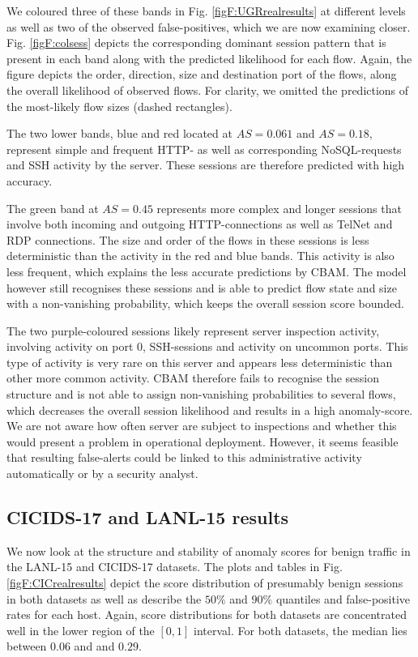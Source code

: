 We coloured three of these bands in Fig. \ref{figF:UGRrealresults} at different levels as well as two of the observed false-positives, which we are now examining closer. Fig. \ref{figF:colsess} depicts the corresponding dominant session pattern that is present in each band along with the predicted likelihood for each flow. Again, the figure depicts the order, direction, size and destination port of the flows, along the overall likelihood of observed flows. For clarity, we omitted the predictions of the most-likely flow sizes (dashed rectangles).

The two lower bands, blue and red located at $AS=0.061$ and $AS=0.18$, represent simple and frequent HTTP- as well as corresponding NoSQL-requests and SSH activity by the server. These sessions are therefore predicted with high accuracy. 

The green band at $AS=0.45$ represents more complex and longer sessions that involve both incoming and outgoing HTTP-connections as well as TelNet and RDP connections. The size and order of the flows in these sessions is less deterministic than the activity in the red and blue bands. This activity is also less frequent, which explains the less accurate predictions by CBAM. The model however still recognises these sessions and is able to predict flow state and size with a non-vanishing probability, which keeps the overall session score bounded.

The two purple-coloured sessions likely represent server inspection activity, involving activity on port 0, SSH-sessions and activity on uncommon ports. This type of activity is very rare on this server and appears less deterministic than other more common activity. CBAM therefore fails to recognise the session structure and is not able to assign non-vanishing probabilities to several flows, which decreases the overall session likelihood and results in a high anomaly-score. We are not aware how often server are subject to inspections and whether this would present a problem in operational deployment. However, it seems feasible that resulting false-alerts could be linked to this administrative activity automatically or by a security analyst.

\subsection{CICIDS-17 and LANL-15 results}

We now look at the structure and stability of anomaly scores for benign traffic in the LANL-15 and CICIDS-17 datasets. 
The plots and tables in Fig. \ref{figF:CICrealresults} depict the score distribution of presumably benign sessions in both datasets as well as describe the $50\%$ and $90\%$ quantiles and false-positive rates for each host. Again, score distributions for both datasets are concentrated well in the lower region of the $[0,1]$ interval. For both datasets, the median lies between $0.06$ and and $0.29$.


